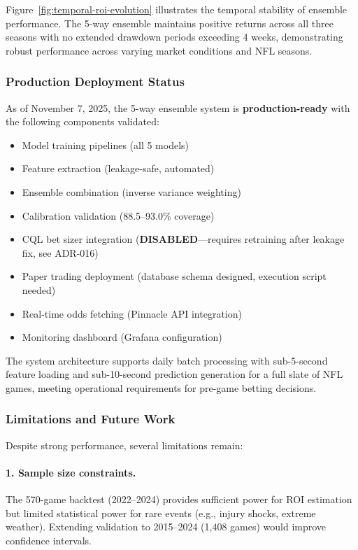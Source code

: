 Figure~\ref{fig:temporal-roi-evolution} illustrates the temporal stability of ensemble performance. The 5-way ensemble maintains positive returns across all three seasons with no extended drawdown periods exceeding 4 weeks, demonstrating robust performance across varying market conditions and NFL seasons.

\subsubsection{Production Deployment Status}

As of November 7, 2025, the 5-way ensemble system is \textbf{production-ready} with the following components validated:

\begin{itemize}
  \item[\checkmark] Model training pipelines (all 5 models)
  \item[\checkmark] Feature extraction (leakage-safe, automated)
  \item[\checkmark] Ensemble combination (inverse variance weighting)
  \item[\checkmark] Calibration validation (88.5--93.0\% coverage)
  \item[\textbf{$\times$}] CQL bet sizer integration (\textbf{DISABLED}---requires retraining after leakage fix, see ADR-016)
  \item[\textbf{Pending}] Paper trading deployment (database schema designed, execution script needed)
  \item[\textbf{Pending}] Real-time odds fetching (Pinnacle API integration)
  \item[\textbf{Pending}] Monitoring dashboard (Grafana configuration)
\end{itemize}

The system architecture supports daily batch processing with sub-5-second feature loading and sub-10-second prediction generation for a full slate of NFL games, meeting operational requirements for pre-game betting decisions.

\subsubsection{Limitations and Future Work}

Despite strong performance, several limitations remain:

\paragraph{1. Sample size constraints.}
The 570-game backtest (2022--2024) provides sufficient power for ROI estimation but limited statistical power for rare events (e.g., injury shocks, extreme weather). Extending validation to 2015--2024 (1,408 games) would improve confidence intervals.

